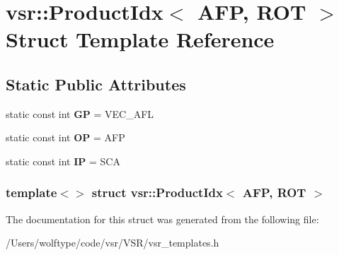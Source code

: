 \hypertarget{structvsr_1_1_product_idx_3_01_a_f_p_00_01_r_o_t_01_4}{\section{vsr\-:\-:Product\-Idx$<$ A\-F\-P, R\-O\-T $>$ Struct Template Reference}
\label{structvsr_1_1_product_idx_3_01_a_f_p_00_01_r_o_t_01_4}
}
\subsection*{Static Public Attributes}
\begin{DoxyCompactItemize}
\item 
\hypertarget{structvsr_1_1_product_idx_3_01_a_f_p_00_01_r_o_t_01_4_a9192ef2d758bbda5cf327fb1ae5f8aec}{static const int {\bfseries G\-P} = V\-E\-C\-\_\-\-A\-F\-L}\label{structvsr_1_1_product_idx_3_01_a_f_p_00_01_r_o_t_01_4_a9192ef2d758bbda5cf327fb1ae5f8aec}

\item 
\hypertarget{structvsr_1_1_product_idx_3_01_a_f_p_00_01_r_o_t_01_4_a02a55f4a19ddf195978617708fce9e0f}{static const int {\bfseries O\-P} = A\-F\-P}\label{structvsr_1_1_product_idx_3_01_a_f_p_00_01_r_o_t_01_4_a02a55f4a19ddf195978617708fce9e0f}

\item 
\hypertarget{structvsr_1_1_product_idx_3_01_a_f_p_00_01_r_o_t_01_4_a319ebf7ee432c3cf9e73b00fdb08d1ec}{static const int {\bfseries I\-P} = S\-C\-A}\label{structvsr_1_1_product_idx_3_01_a_f_p_00_01_r_o_t_01_4_a319ebf7ee432c3cf9e73b00fdb08d1ec}

\end{DoxyCompactItemize}
\subsubsection*{template$<$$>$ struct vsr\-::\-Product\-Idx$<$ A\-F\-P, R\-O\-T $>$}



The documentation for this struct was generated from the following file\-:\begin{DoxyCompactItemize}
\item 
/\-Users/wolftype/code/vsr/\-V\-S\-R/vsr\-\_\-templates.\-h\end{DoxyCompactItemize}
